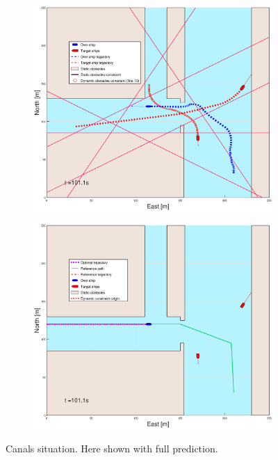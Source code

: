 \begin{figure}[ht]
\begin{subfigure}[b]{0.499\textwidth}
    \end{subfigure}
    \hfill
    \\ 
    \begin{subfigure}[b]{0.49\textwidth}
        \centering
        \includegraphics[width=\textwidth]{Images/Figures/Havn1/_Simple_0fig1_time=101}
    \end{subfigure}
    \hfill
    \begin{subfigure}[b]{0.499\textwidth}
        \centering
        \includegraphics[width=\textwidth]{Images/Figures/Havn1/_Simple_0fig999_time=101}
    \end{subfigure}
    \hfill
    \caption{Canals situation. Here shown with full prediction.}
\end{figure}
